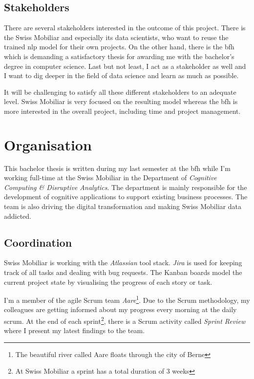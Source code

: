 \subsection{Stakeholders}

There are several stakeholders interested in the outcome of this project. There is the Swiss Mobiliar and especially its data scientists, who want to reuse the trained \acrshort{nlp} model for their own projects. On the other hand, there is the \acrlong{bfh} which is demanding a satisfactory thesis for awarding me with the bachelor's degree in computer science. Last but not least, I act as a stakeholder as well and I want to dig deeper in the field of data science and learn as much as possible.

It will be challenging to satisfy all these different stakeholders to an adequate level. Swiss Mobiliar is very focused on the resulting model whereas the \acrshort{bfh} is more interested in the overall project, including time and project management.

\section{Organisation}

This bachelor thesis is written during my last semester at the \acrlong{bfh} while I'm working full-time at the Swiss Mobiliar in the Department of \emph{Cognitive Computing \& Disruptive Analytics}. The department is mainly responsible for the development of cognitive applications to support existing business processes. The team is also driving the digital transformation and making Swiss Mobiliar data addicted.

\subsection{Coordination}

Swiss Mobiliar is working with the \emph{Atlassian} tool stack. \emph{Jira} is used for keeping track of all tasks and dealing with bug requests. The Kanban boards model the current project state by visualising the progress of each story or task.

I'm a member of the agile Scrum team \emph{Aare}\footnote{The beautiful river called Aare floats through the city of Berne}. Due to the Scrum methodology, my colleagues are getting informed about my progress every morning at the daily scrum. At the end of each sprint\footnote{At Swiss Mobiliar a sprint has a total duration of 3 weeks}, there is a Scrum activity called \emph{Sprint Review} where I present my latest findings to the team.

